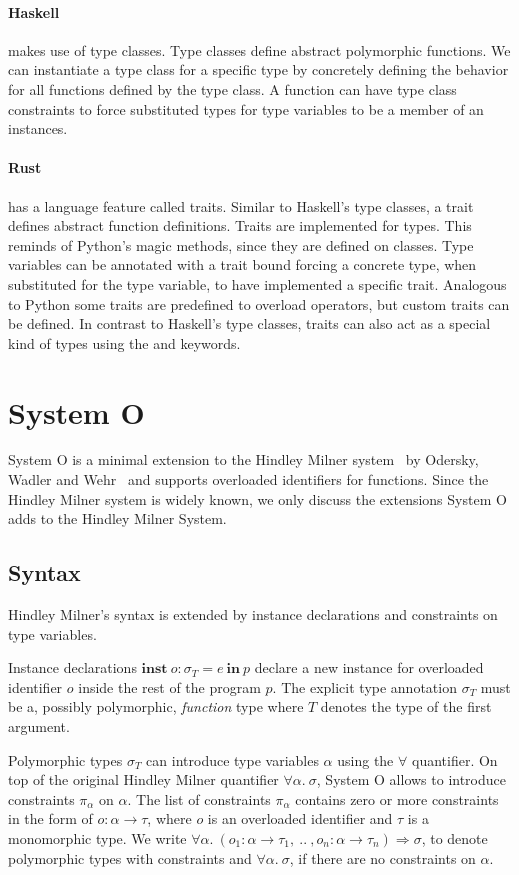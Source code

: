 \documentclass[runningheads]{llncs}
\newcommand{\snip}[1]{\footnotesize{\ttfamily{#1}}}
\begin{document}
\paragraph{Haskell} makes use of type classes. 
Type classes define abstract polymorphic functions. 
We can instantiate a type class for a specific type by concretely defining the behavior for all functions defined by the type class. 
A function can have type class constraints to force substituted types for type variables to be a member of an instances. 
\paragraph{Rust} has a language feature called traits. Similar to Haskell's type classes, a trait defines abstract function definitions. 
Traits are implemented for types. This reminds of Python's magic methods, since they are defined on classes.
Type variables can be annotated with a trait bound forcing a concrete type, when substituted for the type variable, to have implemented a specific trait. 
Analogous to Python some traits are predefined to overload operators, but custom traits can be defined. 
In contrast to Haskell's type classes, traits can also act as a special kind of types using the \snip{dyn} and \snip{impl} keywords.

\section{System O}
System O is a minimal extension to the Hindley Milner system~\cite{hm78} by Odersky, Wadler and Wehr~\cite{oww95} and supports overloaded identifiers for functions. 
Since the Hindley Milner system is widely known, we only discuss the extensions System O adds to the Hindley Milner System. 
\subsection{Syntax}
Hindley Milner's syntax is extended by instance declarations and constraints on type variables.

Instance declarations $\textbf{inst} \ o : \sigma_T = e \ \textbf{in} \ p$ declare a new instance for overloaded identifier $o$ inside the rest of the program $p$. 
The explicit type annotation $\sigma_T$ must be a, possibly polymorphic, \emph{function} type where $T$ denotes the type of the first argument. 

Polymorphic types $\sigma_T$ can introduce type variables $\alpha$ using the $\forall$ quantifier. 
On top of the original Hindley Milner quantifier $\forall \alpha. \ \sigma$, System O allows to introduce constraints $\pi_\alpha$ on $\alpha$. 
The list of constraints $\pi_\alpha$ contains zero or more constraints in the form of $o : \alpha \rightarrow \tau$, where $o$ is an overloaded identifier and $\tau$ is a monomorphic type.
We write $\forall \alpha. \ (o_1 : \alpha \rightarrow \tau_1, \ .. \ , o_n : \alpha \rightarrow \tau_n) \Rightarrow \sigma$, to denote polymorphic types with constraints and $\forall \alpha. \ \sigma$, if there are no constraints on $\alpha$. 
\end{document}
